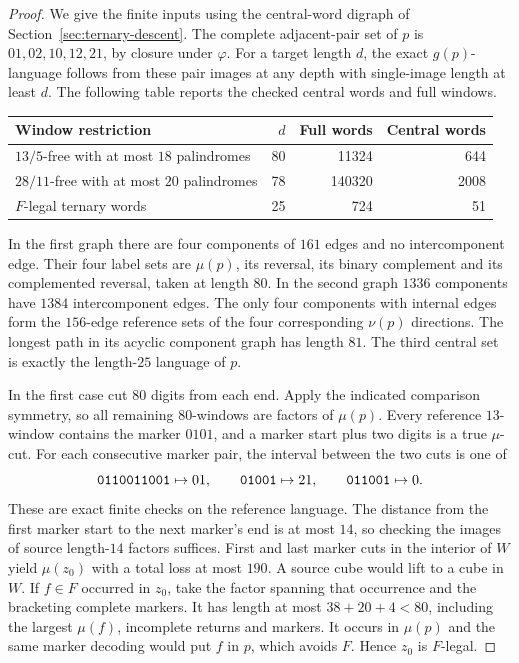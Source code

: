 \begin{proof}
We give the finite inputs using the central-word digraph of Section~\ref{sec:ternary-descent}. The complete adjacent-pair set of \(p\) is \(01,02,10,12,21\), by closure under \(\varphi\). For a target length \(d\), the exact \(g(p)\)-language follows from these pair images at any depth with single-image length at least \(d\). The following table reports the checked central words and full windows.
\begin{center}
\begin{tabular}{@{}lrrr@{}}
\toprule
Window restriction & \(d\) & Full words & Central words\\
\midrule
\(13/5\)-free with at most \(18\) palindromes & 80 & 11324 & 644\\
\(28/11\)-free with at most \(20\) palindromes & 78 & 140320 & 2008\\
\(F\)-legal ternary words & 25 & 724 & 51\\
\bottomrule
\end{tabular}
\end{center}
In the first graph there are four components of \(161\) edges and no intercomponent edge. Their four label sets are \(\mu(p)\), its reversal, its binary complement and its complemented reversal, taken at length \(80\). In the second graph \(1336\) components have \(1384\) intercomponent edges. The only four components with internal edges form the \(156\)-edge reference sets of the four corresponding \(\nu(p)\) directions. The longest path in its acyclic component graph has length \(81\). The third central set is exactly the length-\(25\) language of \(p\).

In the first case cut \(80\) digits from each end. Apply the indicated comparison symmetry, so all remaining \(80\)-windows are factors of \(\mu(p)\). Every reference \(13\)-window contains the marker \(0101\), and a marker start plus two digits is a true \(\mu\)-cut. For each consecutive marker pair, the interval between the two cuts is one of
\[
   \mathtt{0110011001}\mapsto01,\qquad
   \mathtt{01001}\mapsto21,\qquad
   \mathtt{011001}\mapsto0 .
\]
These are exact finite checks on the reference language. The distance from the first marker start to the next marker's end is at most \(14\), so checking the images of source length-\(14\) factors suffices. First and last marker cuts in the interior of \(W\) yield \(\mu(z_0)\) with a total loss at most \(190\). A source cube would lift to a cube in \(W\). If \(f\in F\) occurred in \(z_0\), take the factor spanning that occurrence and the bracketing complete markers. It has length at most \(38+20+4<80\), including the largest \(\mu(f)\), incomplete returns and markers. It occurs in \(\mu(p)\) and the same marker decoding would put \(f\) in \(p\), which avoids \(F\). Hence \(z_0\) is \(F\)-legal.


\end{proof}
